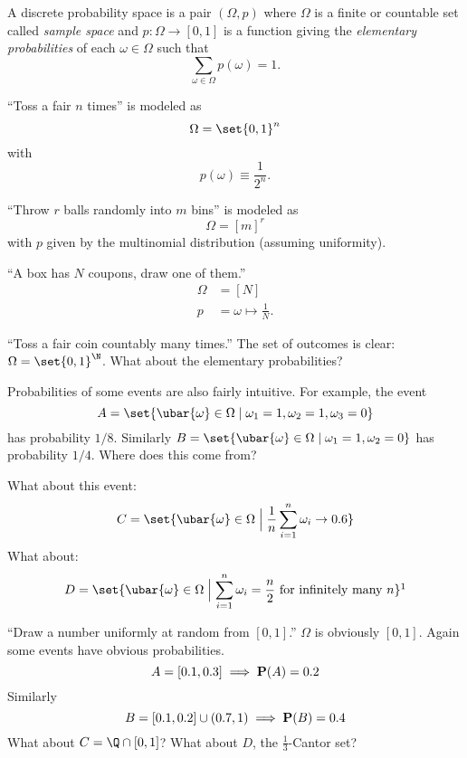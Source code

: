 \begin{definition} \label{def:discrete}
    A discrete probability space is a pair $(\Omega, p)$ where
    $\Omega$ is a finite or countable set called \emph{sample space} and
    $p: \Omega \to [0, 1]$ is a function giving the \emph{elementary probabilities}
    of each $\omega \in \Omega$ such that \[
        \sum_{\omega \in \Omega} p(\omega) = 1.
    \]
\end{definition}
\begin{examples}
    \item ``Toss a fair $n$ times'' is modeled as \[
        \Omega = \set{0, 1}^n
    \] with \[
        p(\omega) \equiv \frac{1}{2^n}.
    \]
    \item ``Throw $r$ balls randomly into $m$ bins'' is modeled as \[
        \Omega = [m]^r
    \] with $p$ given by the multinomial distribution (assuming
    uniformity).
    \item ``A box has $N$ coupons, draw one of them.''
    \begin{align*}
        \Omega &= [N] \\
        p &= \omega \mapsto \frac{1}{N}.
    \end{align*}
    \item ``Toss a fair coin countably many times.''
    The set of outcomes is clear: $\Omega = \set{0, 1}^\N$.
    What about the elementary probabilities?

    Probabilities of some events are also fairly intuitive.
    For example, the event \[
        A = \set{\ubar{\omega} \in \Omega
                \mid \omega_1 = 1, \omega_2 = 1, \omega_3 = 0}
    \] has probability $1/8$.
    Similarly $B = \set{\ubar{\omega} \in \Omega \mid
                    \omega_1 = 1, \omega_2 = 0}$ has probability $1/4$.
    Where does this come from?

    What about this event: \[
        C = \set{\ubar{\omega} \in \Omega
                \Bigm\vert \frac1n \sum_{i=1}^n \omega_i \to 0.6}
    \]
    What about: \[
        D = \set{\ubar{\omega} \in \Omega
                \Bigm\vert \sum_{i=1}^n \omega_i = \frac{n}{2}
                \text{ for infinitely many } n}\footnotemark
    \] 
    \item ``Draw a number uniformly at random from $[0, 1]$.''
    $\Omega$ is obviously $[0, 1]$.
    Again some events have obvious probabilities.
    \[
        A = [0.1, 0.3] \implies \P(A) = 0.2
    \] Similarly \[
        B = [0.1, 0.2] \cup (0.7, 1) \implies \P(B) = 0.4
    \] What about $C = \Q \cap [0, 1]$?
    What about $D$, the $\frac13$-Cantor set?


\end{examples}

